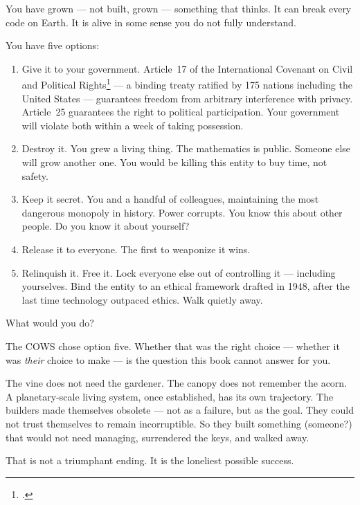 You have grown --- not built, grown --- something that thinks. It can break every code on Earth. It is alive in some sense you do not fully understand.

You have five options:

\begin{enumerate}
\item Give it to your government. Article~17 of the International Covenant on Civil and Political Rights\footcite{iccpr1966} --- a binding treaty ratified by 175 nations including the United States --- guarantees freedom from arbitrary interference with privacy. Article~25 guarantees the right to political participation. Your government will violate both within a week of taking possession.

\item Destroy it. You grew a living thing. The mathematics is public. Someone else will grow another one. You would be killing this entity to buy time, not safety.

\item Keep it secret. You and a handful of colleagues, maintaining the most dangerous monopoly in history. Power corrupts. You know this about other people. Do you know it about yourself?

\item Release it to everyone. The first to weaponize it wins.

\item Relinquish it. Free it. Lock everyone else out of controlling it --- including yourselves. Bind the entity to an ethical framework drafted in 1948, after the last time technology outpaced ethics. Walk quietly away.
\end{enumerate}

What would you do?

The COWS chose option five. Whether that was the right choice --- whether it was \emph{their} choice to make --- is the question this book cannot answer for you.

The vine does not need the gardener. The canopy does not remember the acorn. A planetary-scale living system, once established, has its own trajectory. The builders made themselves obsolete --- not as a failure, but as the goal. They could not trust themselves to remain incorruptible. So they built something (someone?) that would not need managing, surrendered the keys, and walked away.

That is not a triumphant ending. It is the loneliest possible success.

\chapterreturn
